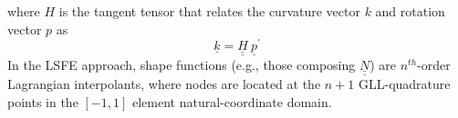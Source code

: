 \documentclass{aiaa-tc}
\newcommand{\tens}[1]{\underline{\underline{#1}}}
\renewcommand{\vec}[1]{\underline{#1}}
\begin{document}
where $H$ is the tangent tensor that relates the curvature vector $k$ and rotation vector $p$ as
\begin{equation}
    \label{Tensor}
    \vec{k} = \tens{H}~ \vec{p}^\prime
\end{equation}
In the LSFE approach, shape functions (e.g., those composing $\tens{N}$) are
$n^{th}$-order Lagrangian interpolants, where nodes are located at the $n+1$
GLL-quadrature points in the $[-1,1]$ element natural-coordinate domain.


 



\end{document}
